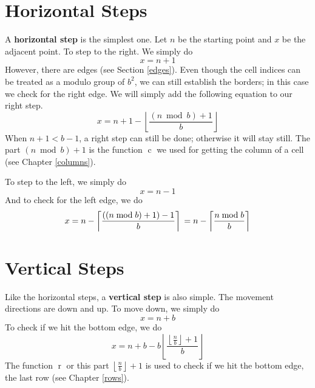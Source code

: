 \documentclass[twoside,openany,12pt]{book}
\begin{document}
    \section{Horizontal Steps} \label{h_steps}
    A \textbf{horizontal step} is the simplest one. Let $n$ be the starting point and $x$ be the adjacent point. To step to the right. We simply do
    \begin{equation}
      x = n + 1
    \end{equation}
    However, there are edges (see Section \ref{edges}). Even though the cell indices can be treated as a modulo group of $b^2$, we can still establish the borders; in this case we check for the right edge. We will simply add the following equation to our right step.
    \begin{equation}
      x = n + 1 - \left\lfloor \frac{(n \bmod b) + 1}{b} \right\rfloor
    \end{equation}
    When $n + 1 < b - 1$, a right step can still be done; otherwise it will stay still. The part $(n \bmod b) + 1$ is the function $\operatorname{c}$ we used for getting the column of a cell (see Chapter \ref{columns}).


    To step to the left, we simply do
    \begin{equation}
      x = n - 1
    \end{equation}
    \newpage
    And to check for the left edge, we do
    \begin{equation}
      x = n - \left\lceil \frac{((n \bmod b) + 1)-1}{b} \right\rceil \\
        = n - \left\lceil \frac{n \bmod b}{b} \right\rceil
    \end{equation}

    \section{Vertical Steps} \label{v_steps}
    Like the horizontal steps, a \textbf{vertical step} is also simple. The movement directions are down and up. To move down, we simply do  
    \begin{equation} 
      x = n + b
    \end{equation}
To check if we hit the bottom edge, we do
    \begin{equation}
      x = n + b - b\left\lfloor \frac{\left\lfloor \frac{n}{b} \right\rfloor+1}{b} \right\rfloor
    \end{equation}
The function $\operatorname{r}$ or this part $\left\lfloor \frac{n}{b} \right\rfloor+1$ is used to check if we hit the bottom edge, the last row (see Chapter \ref{rows}).
\end{document}

